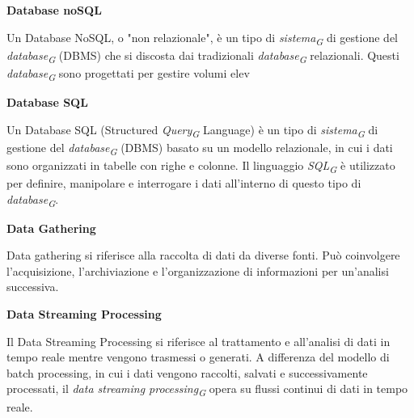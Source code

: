 \documentclass{article}
\begin{document}
\vspace{0.4cm}

\textbf{Database noSQL}

\vspace{0.1cm}

Un Database NoSQL, o "non relazionale", è un tipo di \textit{sistema}\textsubscript{\textit{G}} di gestione del \textit{database}\textsubscript{\textit{G}} (DBMS) che si discosta dai tradizionali \textit{database}\textsubscript{\textit{G}} relazionali. Questi \textit{database}\textsubscript{\textit{G}} sono progettati per gestire volumi elev

\vspace{0.4cm}

\textbf{Database SQL}

\vspace{0.1cm}

Un Database SQL (Structured \textit{Query}\textsubscript{\textit{G}} Language) è un tipo di \textit{sistema}\textsubscript{\textit{G}} di gestione del \textit{database}\textsubscript{\textit{G}} (DBMS) basato su un modello relazionale, in cui i dati sono organizzati in tabelle con righe e colonne. Il linguaggio \textit{SQL}\textsubscript{\textit{G}} è utilizzato per definire, manipolare e interrogare i dati all'interno di questo tipo di \textit{database}\textsubscript{\textit{G}}.

\vspace{0.4cm}

\textbf{Data Gathering}

\vspace{0.1cm}

Data gathering si riferisce alla raccolta di dati da diverse fonti. Può coinvolgere l'acquisizione, l'archiviazione e l'organizzazione di informazioni per un'analisi successiva.

\vspace{0.4cm}

\textbf{Data Streaming Processing}

\vspace{0.1cm}

Il Data Streaming Processing si riferisce al trattamento e all'analisi di dati in tempo reale mentre vengono trasmessi o generati. A differenza del modello di batch processing, in cui i dati vengono raccolti, salvati e successivamente processati, il \textit{data streaming processing}\textsubscript{\textit{G}} opera su flussi continui di dati in tempo reale.

\vspace{0.4cm}
\end{document}
